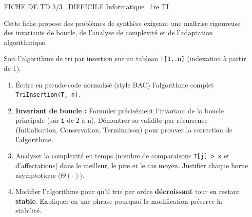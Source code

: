 \documentclass[11pt]{article}
\begin{document}
\begin{tcolorbox}[enhanced,colback=popink,colframe=popink,arc=10pt,boxrule=0pt,left=12pt,right=12pt,top=9pt,bottom=9pt]
{\color{white}\popxbold\small FICHE DE TD 3/3 \textbullet\ DIFFICILE \hfill Informatique \textbullet\ 1re TI\par}
\end{tcolorbox}
\vspace{4pt}
Cette fiche propose des problèmes de synthèse exigeant une maîtrise rigoureuse des invariants de boucle, de l'analyse de complexité et de l'adaptation algorithmique.

\begin{exercice}
Soit l'algorithme de tri par insertion sur un tableau \texttt{T[1..n]} (indexation à partir de 1).
\begin{enumerate}
    \item Écrire en pseudo-code normalisé (style BAC) l'algorithme complet \texttt{TriInsertion(T, n)}.
    \item \textbf{Invariant de boucle :} Formuler précisément l'invariant de la boucle principale (sur \texttt{i} de 2 à n). Démontrer sa validité par récurrence (Initialisation, Conservation, Terminaison) pour prouver la correction de l'algorithme.
    \item Analyser la complexité en temps (nombre de comparaisons \texttt{T[j] > x} et d'affectations) dans le meilleur, le pire et le cas moyen. Justifier chaque borne asymptotique ($\Theta(\cdot)$).
    \item Modifier l'algorithme pour qu'il trie par ordre \textbf{décroissant} tout en restant \textbf{stable}. Expliquer en une phrase pourquoi la modification préserve la stabilité.
\end{enumerate}
\end{exercice}
\end{document}
